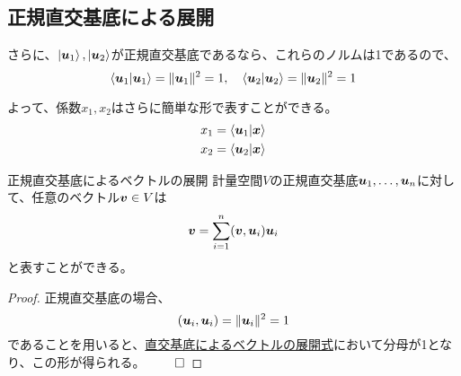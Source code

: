 \documentclass[../../../topic_linear-algebra]{subfiles}
\begin{document}
\subsection{正規直交基底による展開}

さらに、$\ket{\vb*{u}_1}, \ket{\vb*{u}_2}$が正規直交基底であるなら、これらのノルムは1であるので、
\begin{equation*}
  \braket{\vb*{u}_1|\vb*{u}_1} = \|\vb*{u}_1\|^2 = 1, \quad \braket{\vb*{u}_2|\vb*{u}_2} = \|\vb*{u}_2\|^2 = 1
\end{equation*}

よって、係数$x_1, x_2$はさらに簡単な形で表すことができる。
\begin{align*}
  x_1 & = \braket{\vb*{u}_1|\vb*{x}} \\
  x_2 & = \braket{\vb*{u}_2|\vb*{x}}
\end{align*}

\begin{theorem}{正規直交基底によるベクトルの展開}\label{thm:expansion-in-orthonormal-basis}
  計量空間$V$の正規直交基底$\vb*{u}_1, \ldots, \vb*{u}_n$に対して、任意のベクトル$\vb*{v} \in V$は
  \begin{equation*}
    \vb*{v} = \sum_{i=1}^n (\vb*{v}, \vb*{u}_i) \vb*{u}_i
  \end{equation*}
  と表すことができる。
\end{theorem}

\begin{proof}
  正規直交基底の場合、
  \begin{equation*}
    (\vb*{u}_i,\vb*{u}_i) = \|\vb*{u}_i\|^2 = 1
  \end{equation*}
  であることを用いると、\hyperref[thm:vector-expansion-by-orthogonal-basis]{直交基底によるベクトルの展開式}において分母が1となり、この形が得られる。 $\qed$
\end{proof}
\end{document}
